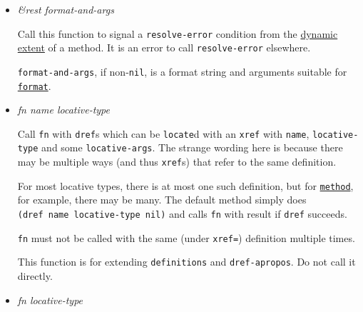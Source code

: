 \begin{itemize}
\item
  \label{x-28DREF-EXT-3ARESOLVE-ERROR-20FUNCTION-29}
  \emph{\&rest format-and-args}

  Call this function to signal a \texttt{resolve-error} condition from
  the
  \href{http://www.lispworks.com/documentation/HyperSpec/Body/26_glo_d.htm\#dynamic_extent}{dynamic
  extent} of a
  method. It is an error to call \texttt{resolve-error} elsewhere.

  \texttt{format-and-args}, if non-\texttt{nil}, is a format string and
  arguments suitable for
  \href{http://www.lispworks.com/documentation/HyperSpec/Body/f_format.htm}{\texttt{format}}.
\item
  \label{x-28DREF-EXT-3AMAP-DEFINITIONS-OF-NAME-20GENERIC-FUNCTION-29}
  \emph{fn name locative-type}

  Call \texttt{fn} with \texttt{dref}s which can be \texttt{locate}d
  with an \texttt{xref} with \texttt{name}, \texttt{locative-type} and
  some \texttt{locative-args}. The strange wording here is because there
  may be multiple ways (and thus \texttt{xref}s) that refer to the same
  definition.

  For most locative types, there is at most one such definition, but for
  \href{http://www.lispworks.com/documentation/HyperSpec/Body/t_method.htm}{\texttt{method}},
  for example, there may be many. The default method simply does
  \texttt{(dref\ name\ locative-type\ nil)} and calls \texttt{fn} with
  result if \texttt{dref} succeeds.

  \texttt{fn} must not be called with the same (under \texttt{xref=})
  definition multiple times.

  This function is for extending \texttt{definitions} and
  \texttt{dref-apropos}. Do not call it directly.
\item
  \label{x-28DREF-EXT-3AMAP-DEFINITIONS-OF-TYPE-20GENERIC-FUNCTION-29}
  \emph{fn locative-type}


\end{itemize}
